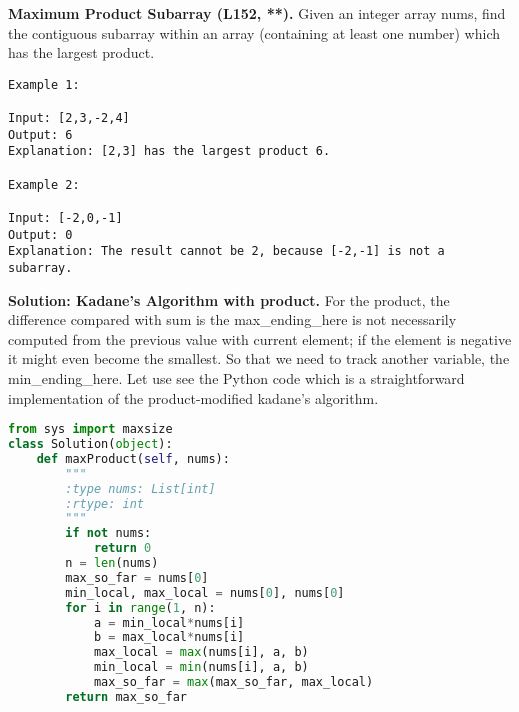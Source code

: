 \documentclass[../main.tex]{subfiles}
\begin{document}
\begin{examples}[resume]
  \item \textbf{Maximum Product Subarray (L152, **).} Given an integer array nums, find the contiguous subarray within an array (containing at least one number) which has the largest product.
\begin{lstlisting}[numbers=none]
Example 1:

Input: [2,3,-2,4]
Output: 6
Explanation: [2,3] has the largest product 6.

Example 2:

Input: [-2,0,-1]
Output: 0
Explanation: The result cannot be 2, because [-2,-1] is not a subarray.
\end{lstlisting}

\textbf{Solution: Kadane's Algorithm with product.} For the product, the difference compared with sum is the max\_ending\_here is not necessarily computed from the previous value with current element; if the element is negative it might even become the smallest. So that we need to track another variable, the min\_ending\_here. Let use see the Python code which is a straightforward implementation of the product-modified kadane's algorithm. 
\begin{lstlisting}[language=Python]
from sys import maxsize
class Solution(object):
    def maxProduct(self, nums):
        """
        :type nums: List[int]
        :rtype: int
        """
        if not nums:
            return 0
        n = len(nums)
        max_so_far = nums[0]
        min_local, max_local = nums[0], nums[0]
        for i in range(1, n):
            a = min_local*nums[i]
            b = max_local*nums[i]
            max_local = max(nums[i], a, b)
            min_local = min(nums[i], a, b)
            max_so_far = max(max_so_far, max_local)
        return max_so_far
\end{lstlisting}
\end{examples}
\end{document}
